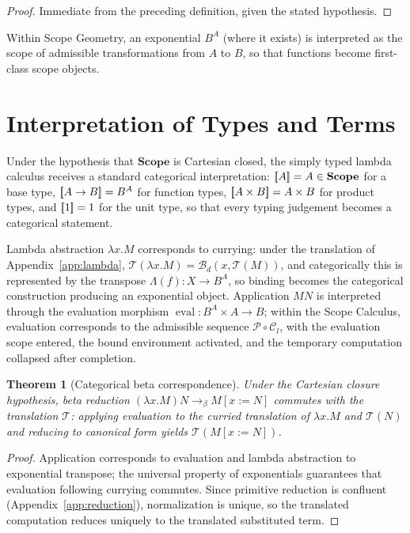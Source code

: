 \documentclass[11pt,twoside,openright]{book}
\numberwithin{equation}{chapter}
\theoremstyle{definition}
\theoremstyle{plain}
\newtheorem{theorem}[definition]{Theorem}
\theoremstyle{remark}
\theoremstyle{definition}
\newcommand{\CatScope}{\mathbf{Scope}}
\newcommand{\Pop}{\mathcal{P}}
\newcommand{\Bind}{\mathcal{B}_d}
\newcommand{\Collapse}{\mathcal{C}_l}
\newcommand{\llbracket}{[\mkern-3.5mu[}
\newcommand{\rrbracket}{]\mkern-3.5mu]}
\begin{document}
\begin{proof}
Immediate from the preceding definition, given the stated hypothesis.
\end{proof}

Within Scope Geometry, an exponential $B^A$ (where it exists) is
interpreted as the scope of admissible transformations from $A$ to $B$,
so that functions become first-class scope objects.

\section{Interpretation of Types and Terms}

Under the hypothesis that $\CatScope$ is Cartesian closed, the simply
typed lambda calculus receives a standard categorical interpretation:
$\llbracket A\rrbracket=A\in\CatScope$ for a base type,
$\llbracket A\to B\rrbracket=B^A$ for function types,
$\llbracket A\times B\rrbracket=A\times B$ for product types, and
$\llbracket1\rrbracket=1$ for the unit type, so that every typing
judgement becomes a categorical statement.

Lambda abstraction $\lambda x.M$ corresponds to currying: under the
translation of Appendix~\ref{app:lambda},
$\mathcal{T}(\lambda x.M)=\Bind(x,\mathcal{T}(M))$, and categorically this
is represented by the transpose $\Lambda(f):X\to B^A$, so binding becomes
the categorical construction producing an exponential object. Application
$MN$ is interpreted through the evaluation morphism
$\operatorname{eval}:B^A\times A\to B$; within the Scope Calculus,
evaluation corresponds to the admissible sequence $\Pop\circ\Collapse$,
with the evaluation scope entered, the bound environment activated, and
the temporary computation collapsed after completion.

\begin{theorem}[Categorical beta correspondence]
Under the Cartesian closure hypothesis, beta reduction
$(\lambda x.M)N\to_\beta M[x:=N]$ commutes with the translation
$\mathcal{T}$: applying evaluation to the curried translation of
$\lambda x.M$ and $\mathcal{T}(N)$ and reducing to canonical form yields
$\mathcal{T}(M[x:=N])$.
\end{theorem}

\begin{proof}
Application corresponds to evaluation and lambda abstraction to
exponential transpose; the universal property of exponentials guarantees
that evaluation following currying commutes. Since primitive reduction is
confluent (Appendix~\ref{app:reduction}), normalization is unique, so the
translated computation reduces uniquely to the translated substituted
term.
\end{proof}
\end{document}
